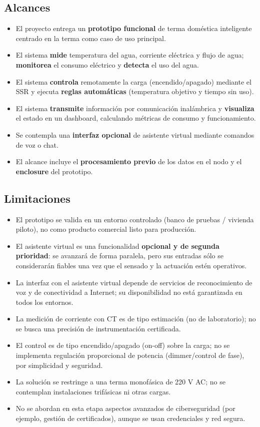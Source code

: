\documentclass[11pt,a4paper]{article}
\begin{document}
\subsection*{Alcances}
\begin{itemize}
  \item El proyecto entrega un \textbf{prototipo funcional} de terma doméstica inteligente centrado en la terma como caso de uso principal.
  \item El sistema \textbf{mide} temperatura del agua, corriente eléctrica y flujo de agua; \textbf{monitorea} el consumo eléctrico y \textbf{detecta} el uso del agua.
  \item El sistema \textbf{controla} remotamente la carga (encendido/apagado) mediante el SSR y ejecuta \textbf{reglas automáticas} (temperatura objetivo y tiempo sin uso).
  \item El sistema \textbf{transmite} información por comunicación inalámbrica y \textbf{visualiza} el estado en un dashboard, calculando métricas de consumo y funcionamiento.
  \item Se contempla una \textbf{interfaz opcional} de asistente virtual mediante comandos de voz o chat.
  \item El alcance incluye el \textbf{procesamiento previo} de los datos en el nodo y el \textbf{enclosure} del prototipo.
\end{itemize}

\subsection*{Limitaciones}
\begin{itemize}
  \item El prototipo se valida en un entorno controlado (banco de pruebas / vivienda piloto), no como producto comercial listo para producción.
  \item El asistente virtual es una funcionalidad \textbf{opcional y de segunda prioridad}: se avanzará de forma paralela, pero sus entradas sólo se considerarán fiables una vez que el sensado y la actuación estén operativos.
  \item La interfaz con el asistente virtual depende de servicios de reconocimiento de voz y de conectividad a Internet; su disponibilidad no está garantizada en todos los entornos.
  \item La medición de corriente con CT es de tipo estimación (no de laboratorio); no se busca una precisión de instrumentación certificada.
  \item El control es de tipo encendido/apagado (on-off) sobre la carga; no se implementa regulación proporcional de potencia (dimmer/control de fase), por simplicidad y seguridad.
  \item La solución se restringe a una terma monofásica de 220 V AC; no se contemplan instalaciones trifásicas ni otras cargas.
  \item No se abordan en esta etapa aspectos avanzados de ciberseguridad (por ejemplo, gestión de certificados), aunque se usan credenciales y red segura.
\end{itemize}
\end{document}
